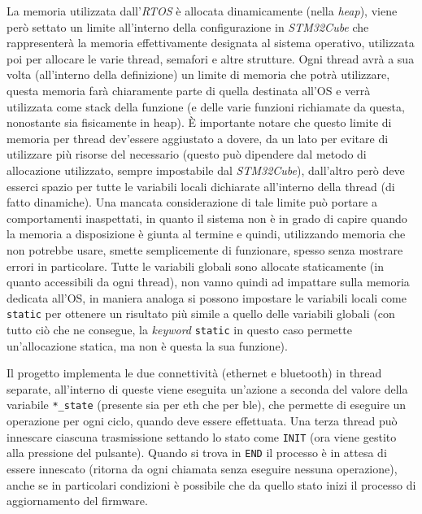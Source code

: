La memoria utilizzata dall'\textit{RTOS} \`e allocata dinamicamente (nella \textit{heap}), viene per\`o settato un limite all'interno della configurazione in \textit{STM32Cube} che rappresenter\`a la memoria effettivamente designata al sistema operativo, utilizzata poi per allocare le varie thread, semafori e altre strutture. Ogni thread avr\`a a sua volta (all'interno della definizione) un limite di memoria che potr\`a utilizzare, questa memoria far\`a chiaramente parte di quella destinata all'OS e verr\`a utilizzata come stack della funzione (e delle varie funzioni richiamate da questa, nonostante sia fisicamente in heap). \`E importante notare che questo limite di memoria per thread dev'essere aggiustato a dovere, da un lato per evitare di utilizzare pi\`u risorse del necessario (questo pu\`o dipendere dal metodo di allocazione utilizzato, sempre impostabile dal \textit{STM32Cube}), dall'altro per\`o deve esserci spazio per tutte le variabili locali dichiarate all'interno della thread (di fatto dinamiche). Una mancata considerazione di tale limite pu\`o portare a comportamenti inaspettati, in quanto il sistema non \`e in grado di capire quando la memoria a disposizione \`e giunta al termine e quindi, utilizzando memoria che non potrebbe usare, smette semplicemente di funzionare, spesso senza mostrare errori in particolare. Tutte le variabili globali sono allocate staticamente (in quanto accessibili da ogni thread), non vanno quindi ad impattare sulla memoria dedicata all'OS, in maniera analoga si possono impostare le variabili locali come \texttt{static} per ottenere un risultato pi\`u simile a quello delle variabili globali (con tutto ci\`o che ne consegue, la \textit{keyword} \texttt{static} in questo caso permette un'allocazione statica, ma non \`e questa la sua funzione).

Il progetto implementa le due connettivit\`a (ethernet e bluetooth) in thread separate, all'interno di queste viene eseguita un'azione a seconda del valore della variabile \texttt{*\_state} (presente sia per eth che per ble), che permette di eseguire un operazione per ogni ciclo, quando deve essere effettuata. Una terza thread pu\`o innescare ciascuna trasmissione settando lo stato come \texttt{INIT} (ora viene gestito alla pressione del pulsante). Quando si trova in \texttt{END} il processo \`e in attesa di essere innescato (ritorna da ogni chiamata senza eseguire nessuna operazione), anche se in particolari condizioni \`e possibile che da quello stato inizi il processo di aggiornamento del firmware.

